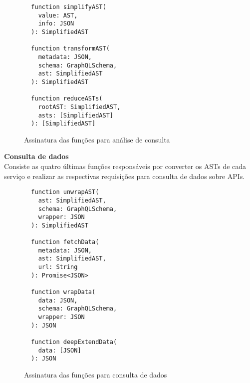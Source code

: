 \begin{figure}[H]
  \centering
  \begin{verbatim}
  function simplifyAST(
    value: AST,
    info: JSON
  ): SimplifiedAST

  function transformAST(
    metadata: JSON,
    schema: GraphQLSchema,
    ast: SimplifiedAST
  ): SimplifiedAST

  function reduceASTs(
    rootAST: SimplifiedAST,
    asts: [SimplifiedAST]
  ): [SimplifiedAST]
  \end{verbatim}
  \caption{Assinatura das funções para análise de consulta}
\end{figure}

\textbf{Consulta de dados} \\

Consiste as quatro últimas funções responsáveis por converter os ASTs de cada serviço e realizar as respectivas requisições para consulta de dados sobre APIs.

\begin{figure}[H]
  \centering
  \begin{verbatim}
  function unwrapAST(
    ast: SimplifiedAST,
    schema: GraphQLSchema,
    wrapper: JSON
  ): SimplifiedAST

  function fetchData(
    metadata: JSON,
    ast: SimplifiedAST,
    url: String
  ): Promise<JSON>

  function wrapData(
    data: JSON,
    schema: GraphQLSchema,
    wrapper: JSON
  ): JSON

  function deepExtendData(
    data: [JSON]
  ): JSON
  \end{verbatim}
  \caption{Assinatura das funções para consulta de dados}
\end{figure}
